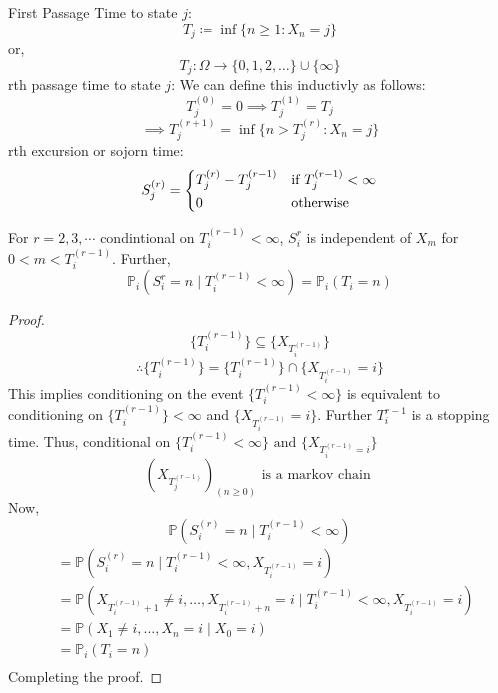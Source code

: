 \begin{definition}
    First Passage Time to state \(j\):
    \[
        T_j \coloneqq  \inf \{n \geq 1 : X_n = j\}
    \]
    or,
    \[
        T_j : \Omega \to \{0,1,2,\dots \} \cup \{\infty\}
    \]
    rth passage time to state \(j\): We can define this inductivly as follows:
    \[
        T_j^{(0)} = 0 \implies T_j^{(1)} = T_j
    \]
    \[
        \implies T_j^{(r+1)} = \inf \{n > T_j^{(r)} : X_n = j\}
    \]
    rth excursion or sojorn time:
    \[
        S_j^{(r)} = \begin{dcases}
            T_j^{(r)} - T_j^{(r-1)} & \text{if } T_j^{(r-1)} < \infty \\
            0 & \text{otherwise}
        \end{dcases}
    \]
\end{definition}
\begin{lemma} 
    For \( r = 2,3,\cdots \) condintional on \(T_i^{(r-1)} < \infty \), \(S_i^r\) is independent
    of \(X_m\) for \(0 < m < T_i^{(r-1)}\). Further,
    \[
        \mathbb{P}_i (S_i^r = n \mid T_i^{(r-1)} < \infty) = \mathbb{P}_i(T_i = n)  
    \]
\end{lemma}
\begin{proof}
    \[
        \{T_i^{(r-1)}\} \subseteq \{X_{T_i^{(r-1)}}\}
    \]
    \[
        \therefore \{T_i^{(r-1)}\} = \{T_i^{(r-1)}\} \cap \{X_{T_i^{(r-1)}} = i\}
    \]
    This implies conditioning on the event \(\{T_i ^{(r-1)} < \infty \} \) is equivalent
    to conditioning on \(\{T_i^{(r-1)}\} < \infty \) and \( \{X_{T_i^{(r-1)}} = i\} \). Further
    \(T_i^{r-1}\) is a stopping time. Thus, conditional on \(\{T_i^{(r-1)} < \infty\} \text{ and } \{
        X_{T_i^{(r-1)} = i}\} \)
    \[
        {\left( 
            X_{T_j^{(r-1)}}
         \right)}_{(n \geq 0)} \text{ is a markov chain } 
    \]
    Now,
    \[
        \mathbb{P} (
            S_i^{(r)} = n \mid T_i^{(r-1)} < \infty
            ) 
    \]
    \[
        \begin{aligned}
                &= \mathbb{P} (S_i^{(r)} = n \mid T_i^{(r-1)} < \infty, X_{T_i^{(r-1)}} = i) \\
                &= \mathbb{P} (
                    X_{T_i^{(r-1)} + 1} \neq i, \dots , X_{T_i^{(r-1)} + n} = i 
                \mid T_i^{(r-1)} < \infty, X_{T_i^{(r-1)}} = i) \\
                &= \mathbb{P} (
                    X_1 \neq i, \dots , X_n = i \mid X_0 = i
                ) \\
                &= \mathbb{P}_i (T_i = n) \\
            \end{aligned}
    \]
    Completing the proof.
\end{proof}

